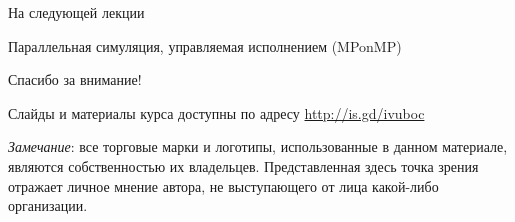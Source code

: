 \begin{frame}{На следующей лекции}
\centering

Параллельная симуляция, управляемая исполнением (MPonMP)

\end{frame}


\begin{frame}

{\huge{Спасибо за внимание!}\par}

\vfill

Слайды и материалы курса доступны по адресу \url{http://is.gd/ivuboc} %

\vfill

\tiny{\textit{Замечание}: все торговые марки и логотипы, использованные в данном материале, являются собственностью их владельцев. Представленная здесь точка зрения отражает личное мнение автора, не выступающего от лица какой-либо организации.}

\end{frame}


